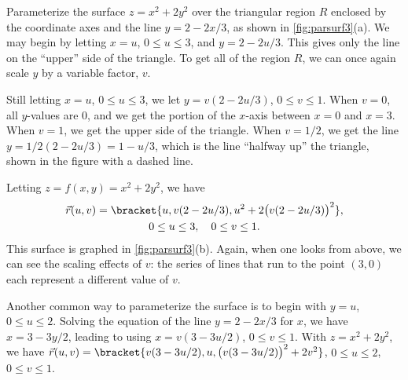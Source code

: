 \begin{example}\label{ex_parsurf3}%
Parameterize the surface $z=x^2+2y^2$ over the triangular region $R$ enclosed by the coordinate axes and the line $y=2-2x/3$, as shown in \autoref{fig:parsurf3}(a).
\solution
We may begin by letting $x=u$, $0\leq u\leq 3$,  and $y = 2-2u/3$. This gives only the line on the ``upper'' side of the triangle. To get all of the region $R$, we can once again scale $y$ by a variable factor, $v$.

Still letting $x = u$, $0\leq u\leq 3$, we let $y = v(2-2u/3)$, $0\leq v\leq 1$. When $v=0$, all $y$-values are 0, and we get the portion of the $x$-axis between $x=0$ and $x=3$. When $v=1$, we get the upper side of the triangle. When $v=1/2$, we get the line $y=1/2(2-2u/3) = 1-u/3$, which is the line ``halfway up'' the triangle, shown in the figure with a dashed line.

Letting $z = f(x,y) = x^2+2y^2$, we have
\begin{multline*}
\vec r(u,v) =\bracket{u, v(2-2u/3), u^2+2\bigl(v(2-2u/3)\bigr)^2},\\
0\leq u\leq 3,\quad 0\leq v\leq 1.
\end{multline*}
This surface is graphed in \autoref{fig:parsurf3}(b). Again, when one looks from above, we can see the scaling effects of $v$: the series of lines that run to the point $(3,0)$ each represent a different value of $v$.

Another common way to parameterize the surface is to begin with $y=u$, $0\leq u\leq 2$. Solving the equation of the line $y=2-2x/3$ for $x$, we have $x = 3-3y/2$, leading to using $x=v(3-3u/2)$, $0\leq v\leq 1$. With $z=x^2+2y^2$, we have $\vec r(u,v) =\bracket{v(3-3u/2),u, \bigl(v(3-3u/2)\bigr)^2+2v^2}$, $0\leq u\leq 2$, $0\leq v\leq 1$.
\end{example}

